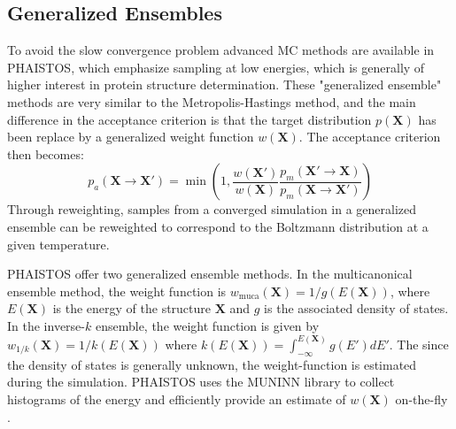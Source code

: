 \subsection{Generalized Ensembles}
To avoid the slow convergence problem advanced MC methods are available in PHAISTOS, which emphasize sampling at low energies, which is generally of higher interest in protein structure determination.
These "generalized ensemble" methods are very similar to the Metropolis-Hastings method, and the main difference in the acceptance criterion is that the target distribution $p(\mathbf{X})$ has been replace by a generalized weight function $w(\mathbf{X})$. 
The acceptance criterion then becomes:
\begin{equation}
    \label{eq:mc_gh}
    p_a(\mathbf{X} \rightarrow \mathbf{X'}) = \min \left( 1,
    \frac{w(\mathbf{X'})}
         {w(\mathbf{X})}
    \frac{p_m(\mathbf{X'} \rightarrow \mathbf{X})}
         {p_m(\mathbf{X} \rightarrow \mathbf{X'})} \right)
\end{equation}
Through reweighting, samples from a converged simulation in a generalized ensemble can be reweighted to correspond to the Boltzmann distribution at a given temperature.

PHAISTOS offer two generalized ensemble methods.
In the multicanonical ensemble method, the weight function is $w_\mathrm{muca}(\mathbf{X}) = 1/g(E(\mathbf{X}))$, where $E(\mathbf{X})$ is the energy of the structure $\mathbf{X}$ and $g$ is the associated density of states.
In the inverse-$k$ ensemble, the weight function is given by $w_\textit{1/k}(\mathbf{X}) = 1/k(E(\mathbf{X}))$ where $k(E(\mathbf{X})) = \int_{-\infty}^{E(\mathbf{X})} g(E') dE'$.
The since the density of states is generally unknown, the weight-function is estimated during the simulation.
PHAISTOS uses the MUNINN library to collect histograms of the energy and efficiently provide an estimate of $w(\mathbf{X})$ on-the-fly \cite{muninn}.


